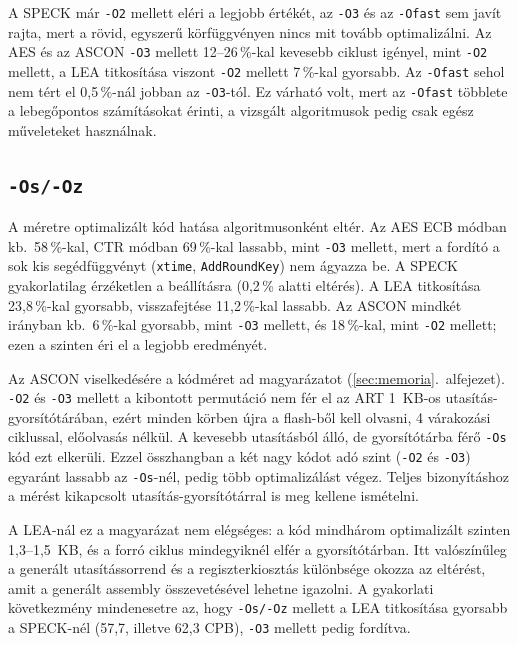 \documentclass[a4paper,12pt]{report}
\theoremstyle{definition}
\theoremstyle{remark}
\begin{document}
A SPECK már \texttt{-O2} mellett eléri a legjobb értékét, az \texttt{-O3} és az \texttt{-Ofast} sem javít rajta, mert a rövid, egyszerű körfüggvényen nincs mit tovább optimalizálni. Az AES és az ASCON \texttt{-O3} mellett 12--26\,\%-kal kevesebb ciklust igényel, mint \texttt{-O2} mellett, a LEA titkosítása viszont \texttt{-O2} mellett 7\,\%-kal gyorsabb. Az \texttt{-Ofast} sehol nem tért el 0,5\,\%-nál jobban az \texttt{-O3}-tól. Ez várható volt, mert az \texttt{-Ofast} többlete a lebegőpontos számításokat érinti, a vizsgált algoritmusok pedig csak egész műveleteket használnak.

\subsection{\texttt{-Os/-Oz}}

A méretre optimalizált kód hatása algoritmusonként eltér. Az AES ECB módban kb.\ 58\,\%-kal, CTR módban 69\,\%-kal lassabb, mint \texttt{-O3} mellett, mert a fordító a sok kis segédfüggvényt (\texttt{xtime}, \texttt{AddRoundKey}) nem ágyazza be. A SPECK gyakorlatilag érzéketlen a beállításra (0,2\,\% alatti eltérés). A LEA titkosítása 23,8\,\%-kal gyorsabb, visszafejtése 11,2\,\%-kal lassabb. Az ASCON mindkét irányban kb.\ 6\,\%-kal gyorsabb, mint \texttt{-O3} mellett, és 18\,\%-kal, mint \texttt{-O2} mellett; ezen a szinten éri el a legjobb eredményét.

Az ASCON viselkedésére a kódméret ad magyarázatot (\ref{sec:memoria}.~alfejezet). \texttt{-O2} és \texttt{-O3} mellett a kibontott permutáció nem fér el az ART 1~KB-os utasítás-gyorsítótárában, ezért minden körben újra a flash-ből kell olvasni, 4 várakozási ciklussal, előolvasás nélkül. A kevesebb utasításból álló, de gyorsítótárba férő \texttt{-Os} kód ezt elkerüli. Ezzel összhangban a két nagy kódot adó szint (\texttt{-O2} és \texttt{-O3}) egyaránt lassabb az \texttt{-Os}-nél, pedig több optimalizálást végez. Teljes bizonyításhoz a mérést kikapcsolt utasítás-gyorsítótárral is meg kellene ismételni.

A LEA-nál ez a magyarázat nem elégséges: a kód mindhárom optimalizált szinten 1,3--1,5~KB, és a forró ciklus mindegyiknél elfér a gyorsítótárban. Itt valószínűleg a generált utasítássorrend és a regiszterkiosztás különbsége okozza az eltérést, amit a generált assembly összevetésével lehetne igazolni. A gyakorlati következmény mindenesetre az, hogy \texttt{-Os/-Oz} mellett a LEA titkosítása gyorsabb a SPECK-nél (57,7, illetve 62,3 CPB), \texttt{-O3} mellett pedig fordítva.
\end{document}

